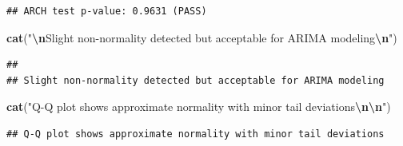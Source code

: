 \documentclass[
]{article}
\newenvironment{Shaded}{\begin{snugshade}}{\end{snugshade}}
\newcommand{\AttributeTok}[1]{\textcolor[rgb]{0.13,0.29,0.53}{#1}}
\newcommand{\CommentTok}[1]{\textcolor[rgb]{0.56,0.35,0.01}{\textit{#1}}}
\newcommand{\DecValTok}[1]{\textcolor[rgb]{0.00,0.00,0.81}{#1}}
\newcommand{\FunctionTok}[1]{\textcolor[rgb]{0.13,0.29,0.53}{\textbf{#1}}}
\newcommand{\NormalTok}[1]{#1}
\newcommand{\OtherTok}[1]{\textcolor[rgb]{0.56,0.35,0.01}{#1}}
\newcommand{\SpecialCharTok}[1]{\textcolor[rgb]{0.81,0.36,0.00}{\textbf{#1}}}
\newcommand{\StringTok}[1]{\textcolor[rgb]{0.31,0.60,0.02}{#1}}
\begin{document}
\begin{verbatim}
## ARCH test p-value: 0.9631 (PASS)
\end{verbatim}

\begin{Shaded}
\begin{Highlighting}[]
\FunctionTok{cat}\NormalTok{(}\StringTok{"}\SpecialCharTok{\textbackslash{}n}\StringTok{Slight non{-}normality detected but acceptable for ARIMA modeling}\SpecialCharTok{\textbackslash{}n}\StringTok{"}\NormalTok{)}
\end{Highlighting}
\end{Shaded}

\begin{verbatim}
## 
## Slight non-normality detected but acceptable for ARIMA modeling
\end{verbatim}

\begin{Shaded}
\begin{Highlighting}[]
\FunctionTok{cat}\NormalTok{(}\StringTok{"Q{-}Q plot shows approximate normality with minor tail deviations}\SpecialCharTok{\textbackslash{}n\textbackslash{}n}\StringTok{"}\NormalTok{)}
\end{Highlighting}
\end{Shaded}

\begin{verbatim}
## Q-Q plot shows approximate normality with minor tail deviations
\end{verbatim}

\begin{Shaded}
\end{Shaded}
\end{document}
